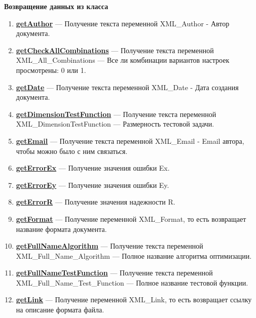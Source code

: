 \documentclass[a4paper,12pt]{article}
\begin{document}
\textbf{Возвращение данных из класса}
\begin{enumerate}
	
	\item \textbf{\hyperref[getAuthor]{getAuthor}} --- Получение текста переменной XML\_Author - Автор документа.
	
	\item \textbf{\hyperref[getCheckAllCombinations]{getCheckAllCombinations}} --- Получение текста переменной  XML\_All\_Combinations --- Все ли комбинации вариантов настроек просмотрены: 0 или 1.
	
	\item \textbf{\hyperref[getDate]{getDate}} --- Получение текста переменной  XML\_Date - Дата создания документа.
	
	\item \textbf{\hyperref[getDimensionTestFunction]{getDimensionTestFunction}} --- Получение текста переменной  XML\_DimensionTestFunction --- Размерность тестовой задачи.
	
	\item \textbf{\hyperref[getEmail]{getEmail}} --- Получение текста переменной  XML\_Email - Email автора, чтобы можно было с ним связаться.
	
	\item \textbf{\hyperref[getErrorEx]{getErrorEx}} --- Получение значения ошибки Ex.
	
	\item \textbf{\hyperref[getErrorEy]{getErrorEy}} --- Получение значения ошибки Ey.
	
	\item \textbf{\hyperref[getErrorR]{getErrorR}} --- Получение значения надежности R.
	
	\item \textbf{\hyperref[getFormat]{getFormat}} --- Получение переменной XML\_Format, то есть возвращает название формата документа.
	
	\item \textbf{\hyperref[getFullNameAlgorithm]{getFullNameAlgorithm}} --- Получение текста переменной  XML\_Full\_Name\_Algorithm --- Полное название алгоритма оптимизации.
	
	\item \textbf{\hyperref[getFullNameTestFunction]{getFullNameTestFunction}} --- Получение текста переменной  XML\_Full\_Name\_Test\_Function --- Полное название тестовой функции.
	
	\item \textbf{\hyperref[getLink]{getLink}} --- Получение переменной XML\_Link, то есть возвращает ссылку на описание формата файла.
	

\end{enumerate}
\end{document}
